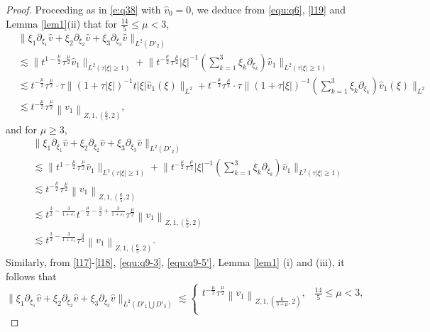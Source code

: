 \documentclass[11pt,twoside]{article}
\newcommand{\p}{\partial}
\newcommand{\f}{\frac}
\newcommand{\ds}{\displaystyle}
\theoremstyle{plain}
\theoremstyle{definition}
\theoremstyle{remark}
\numberwithin{equation}{section}
\begin{document}
\begin{proof}
Proceeding as in \eqref{e:q38} with $\hat{v}_0=0$, we deduce from \eqref{equ:q6}, \eqref{l19} and Lemma \ref{lem1}(ii) that for $\f{14}{5}\leq\mu<3$,
\begin{equation}\label{l20'}
\begin{aligned}
&\big\|\xi_1\p_{\xi_1}\hat{v}+\xi_2\p_{\xi_2}\hat{v}+\xi_3\p_{\xi_3}\hat{v}\big\|_{L^2(D'_2)}
\\
&\lesssim \big\|t^{1-\frac{\mu}{2}}\tau^{\f{\mu}{2}}\hat{v}_{1}\big\|_{L^{2}(\tau|\xi|\geq1)}+ \big\|t^{-\f{\mu}{2}}\tau^{\f{\mu}{2}}|\xi|^{-1}(\ds\sum_{k=1}^3\xi_k\p_{\xi_k})\hat{v}_{1}\big\|_{L^{2}(\tau|\xi|\geq1)}\\
& \lesssim t^{-\frac{\mu}{2}}\tau^{\frac{\mu}{2}}\cdot\tau\big\| (1+\tau|\xi|)^{-1}t|\xi|  \hat{v}_1(\xi)\big\|_{L^2}+t^{-\frac{\mu}{2}}\tau^{\frac{\mu}{2}}\cdot\tau\big\| (1+\tau|\xi|)^{-1}(\ds\sum_{k=1}^3\xi_k\p_{\xi_k})  \hat{v}_1(\xi)\big\|_{L^2}\\
&\lesssim  t^{-\f{\mu}{2}}\tau^{\f{\mu}{2}}\left\|v_1\right\|_{Z, 1,(\f65, 2)},
\end{aligned}
\end{equation}
and for $\mu\geq3$,
\begin{equation}\label{l20}
\begin{aligned}
&\big\|\xi_1\p_{\xi_1}\hat{v}+\xi_2\p_{\xi_2}\hat{v}+\xi_3\p_{\xi_3}\hat{v}\big\|_{L^2(D'_2)}
\\
&\lesssim \big\|t^{1-\frac{\mu}{2}}\tau^{\f{\mu}{2}}\hat{v}_{1}\big\|_{L^{2}(\tau|\xi|\geq1)}+ \big\|t^{-\f{\mu}{2}}\tau^{\f{\mu}{2}}|\xi|^{-1}(\sum_{k=1}^3\xi_k\p_{\xi_k})\hat{v}_{1}\big\|_{L^{2}(\tau|\xi|\geq1)}\\
&\lesssim  t^{-\f{\mu}{2}}\tau^{\f{\mu}{2}}\left\|v_1\right\|_{Z, 1,(\f65, 2)}\\
&\lesssim t^{\f32-\frac{3}{1+\varepsilon_1}}t^{-\f{\mu}{2}-\f32+\frac{3}{1+\varepsilon_1}} \tau^{\f{\mu}{2}}\left\|v_1\right\|_{Z, 1,(\f65, 2)}\\
&\lesssim  t^{\f32-\frac{3}{1+\varepsilon_1}} \tau^{\f32}\left\|v_1\right\|_{Z, 1,(\f65, 2)}.
\end{aligned}
\end{equation}
Similarly, from \eqref{l17}-\eqref{l18}, \eqref{equ:q9-3}, \eqref{equ:q9-5'}, Lemma \ref{lem1} (i) and (iii), it follows that
\begin{equation}\label{l21}
\big\|\xi_1\p_{\xi_1}\hat{v}+\xi_2\p_{\xi_2}\hat{v}+\xi_3\p_{\xi_3}\hat{v}\big\|_{L^2(D'_1\bigcup D'_3)}
\lesssim \begin{cases}
t^{-\f{\mu}{2}}\tau^{\f{\mu}{2}}\left\|v_1\right\|_{Z, 1,(\f{6}{3+\mu}, 2)},&\f{14}{5}\leq\mu<3,\\

\end{cases}
\end{equation}
\end{proof}
\end{document}
